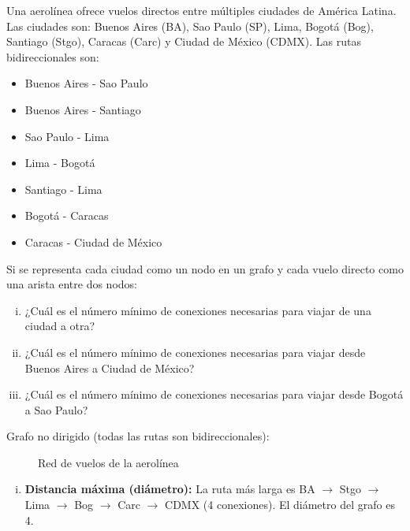 \begin{prob} 
Una aerolínea ofrece vuelos directos entre múltiples ciudades de América Latina. Las ciudades son: Buenos Aires (BA), Sao Paulo (SP), Lima, Bogotá (Bog), Santiago (Stgo), Caracas (Carc) y Ciudad de México (CDMX). Las rutas bidireccionales son:
\begin{itemize}
\item Buenos Aires - Sao Paulo
\item Buenos Aires - Santiago
\item Sao Paulo - Lima
\item Lima - Bogotá
\item Santiago - Lima
\item Bogotá - Caracas
\item Caracas - Ciudad de México
\end{itemize}

Si se representa cada ciudad como un nodo en un grafo y cada vuelo directo como una arista entre dos nodos:
\begin{enumerate}[i.]
\item ¿Cuál es el número mínimo de conexiones necesarias para viajar de una ciudad a otra?
\item ¿Cuál es el número mínimo de conexiones necesarias para viajar desde Buenos Aires a Ciudad de México?
\item ¿Cuál es el número mínimo de conexiones necesarias para viajar desde Bogotá a Sao Paulo?
\end{enumerate}

\begin{myproof}
Grafo no dirigido (todas las rutas son bidireccionales):

\begin{figure}[H]
\centering
{}
\caption{Red de vuelos de la aerolínea}
\end{figure}

\begin{enumerate}[i.]
\item \textbf{Distancia máxima (diámetro):} 
La ruta más larga es BA $\to$ Stgo $\to$ Lima $\to$ Bog $\to$ Carc $\to$ CDMX (4 conexiones). 
El diámetro del grafo es 4.


\end{enumerate}
\end{myproof}
\end{prob}
